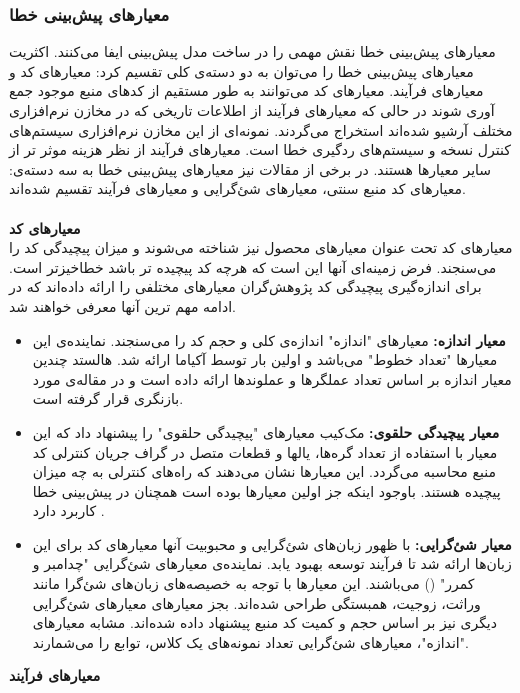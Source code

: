 \subsubsection{معیارهای پیش‌بینی خطا}

معیارهای پیش‌بینی خطا نقش مهمی را در ساخت مدل پیش‌بینی ایفا می‌کنند. اکثریت معیارهای پیش‌بینی خطا را می‌توان به دو دسته‌ی  کلی تقسیم کرد: معیارهای کد و معیارهای فرآیند. معیارهای کد می‌توانند به طور مستقیم از کدهای منبع موجود جمع آوری شوند در حالی که معیارهای فرآیند  از اطلاعات تاریخی که در مخازن نرم‌افزاری مختلف آرشیو شده‌اند استخراج می‌گردند. نمونه‌ای از این مخازن نرم‌افزاری سیستم‌های کنترل نسخه و سیستم‌های ردگیری خطا است. معیار‌های فرآیند از نظر هزینه موثر تر از سایر معیارها هستند\cite{arisholm2010systematic}. در برخی از مقالات نیز معیارهای  پیش‌بینی خطا به سه دسته‌ی: معیارهای کد منبع سنتی، معیارهای شئ‌گرایی و معیارهای فرآیند تقسیم شده‌اند\cite{radjenovic2013software}.\\\\
\textbf{معیارهای کد} \\

معیارهای کد تحت عنوان معیارهای محصول
نیز شناخته می‌شوند و میزان پیچیدگی کد را می‌سنجند. فرض زمینه‌ای آنها این است که هرچه کد پیچیده تر باشد خطا‌خیز‌تر است. برای اندازه‌گیری پیچیدگی کد پژوهش‌گران معیار‌های مختلفی را ارائه داده‌اند که در ادامه   مهم ترین آنها معرفی خواهند شد. 
\begin{itemize}
	\item \textbf{معیار اندازه: }
معیارهای "اندازه" اندازه‌ی کلی و حجم کد را می‌سنجند. نماینده‌ی این معیارها "تعداد خطوط" می‌باشد و اولین بار توسط آکیاما 
 \cite{akiyama1971example}  
 ارائه شد. هالستد
 \cite{halstead1977elements} 
 چندین معیار اندازه بر اساس  تعداد عملگرها و عملوند‌ها ارائه داده است و در مقاله‌ی \cite{pawade2016exploring} مورد بازنگری قرار گرفته است.
\item \textbf{معیار پیچیدگی حلقوی: }
مک‌کیب معیارهای "پیچیدگی حلقوی"
را پیشنهاد داد که این معیار با استفاده از تعداد گره‌ها، یالها و قطعات متصل در گراف جریان کنترلی  کد منبع محاسبه می‌گردد\cite{mccabe1976complexity}. این معیارها نشان می‌دهند که راه‌های کنترلی به چه میزان پیچیده هستند. باوجود اینکه جز اولین معیارها بوده است همچنان در پیش‌بینی خطا کاربرد دارد \cite{malhotra2014comparative}.
\item \textbf{معیار شئ‌گرایی: }
با ظهور زبان‌های شئ‌گرایی و محبوبیت آنها معیارهای کد  برای این زبان‌ها ارائه شد تا فرآیند توسعه بهبود یابد. نماینده‌ی معیارهای شئ‌گرایی "چدامبر و کمرر" 
() می‌باشند\cite{chidamber1994metrics}. این معیارها با توجه به خصیصه‌های زبان‌های شئ‌گرا مانند وراثت، زوجیت، همبستگی طراحی شده‌اند. بجز معیارهای  معیارهای شئ‌گرایی دیگری نیز بر اساس حجم و کمیت کد منبع پیشنهاد داده شده‌اند. مشابه معیارهای "اندازه"، معیارهای شئ‌گرایی تعداد نمونه‌های یک کلاس، توابع را می‌شمارند. \\
\end{itemize}
\textbf{معیارهای فرآیند} \\

